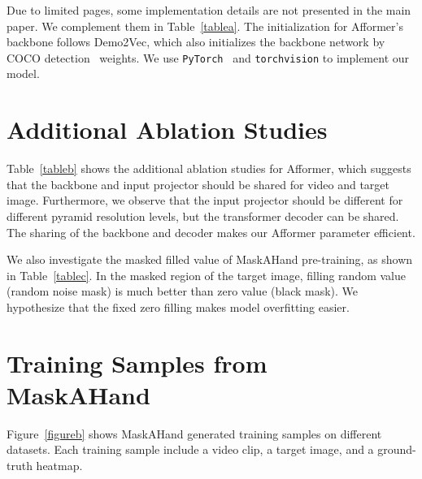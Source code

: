 \documentclass[10pt,twocolumn,letterpaper]{article}
\begin{document}
Due to limited pages, some implementation details are not presented in the main paper. We complement them in Table~\ref{tablea}. The initialization for Afformer's backbone follows Demo2Vec\cite{demo2vec}, which also initializes the backbone network by COCO detection~\cite{coco} weights. We use \texttt{PyTorch}~\cite{pytorch} and \texttt{torchvision} to implement our model. 

\section{Additional Ablation Studies}\label{sectionc}

Table~\ref{tableb} shows the additional ablation studies for Afformer, which suggests that the backbone and input projector should be shared for video and target image. Furthermore, we observe that the input projector should be different for different pyramid resolution levels, but the transformer decoder can be shared. The sharing of the backbone and decoder makes our Afformer parameter efficient. 

We also investigate the masked filled value of MaskAHand pre-training, as shown in Table~\ref{tablec}. In the masked region of the target image, filling random value (\ie random noise mask) is much better than zero value (\ie black mask). We hypothesize that the fixed zero filling makes model overfitting easier.

\section{Training Samples from MaskAHand}\label{sectiond}

Figure~\ref{figureb} shows MaskAHand generated training samples on different datasets. Each training sample include a video clip, a target image, and a ground-truth heatmap.
\end{document}
